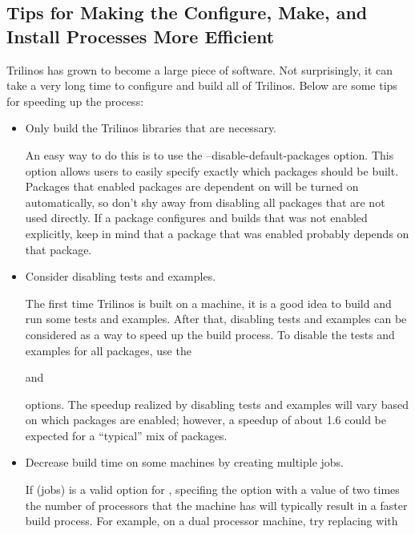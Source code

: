 \subsection{Tips for Making the Configure, Make, and Install Processes More Efficient}

Trilinos has grown to become a large piece of software.  Not surprisingly,
it can take a very long time to configure and build all of Trilinos.  Below 
are some tips for speeding up the process:

\begin{itemize}
\item Only build the Trilinos libraries that are necessary.

An easy way to do this is to use the --disable-default-packages option.  
This option allows users to easily specify exactly which packages should be 
built.  Packages that enabled 
packages are dependent on will be turned on automatically, so
don't shy away from disabling all packages that are not used directly.  
If a package configures and builds that was not enabled explicitly, 
keep in mind that a package that was enabled probably depends on that package.

\item Consider disabling tests and examples.

The first time Trilinos is built on a machine, it is a good idea to build 
and run some tests and examples.  After that, disabling tests and examples
can be considered as a way to speed up the build process.  To disable 
the tests and examples for all packages, use the 

and


options.  The speedup realized by disabling tests and examples will vary based 
on which packages are enabled; however, a speedup of about 1.6 could be 
expected for a ``typical'' mix of packages.

\item Decrease build time on some machines by creating multiple jobs.

If  (jobs) is a valid option for ,
specifing the  option with a value of two times the number 
of processors that the machine has will typically result in a faster build 
process.  For example, on a dual processor machine, try replacing 
 with 



\end{itemize}
